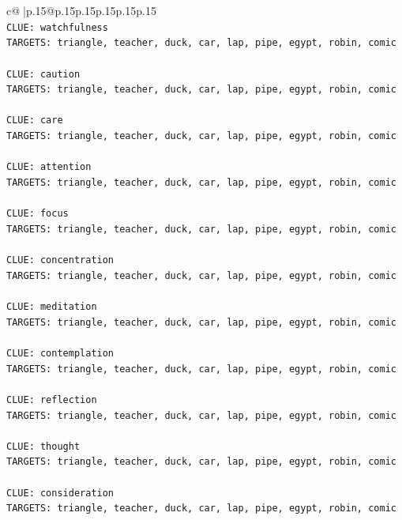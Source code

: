 \documentclass{article}
\begin{document}
{\begin{supertabular}{c@{$\;$}|p{.15\linewidth}@{}p{.15\linewidth}p{.15\linewidth}p{.15\linewidth}p{.15\linewidth}p{.15\linewidth}}
{{{\\ 
\texttt{CLUE: watchfulness} \\
\texttt{TARGETS: triangle, teacher, duck, car, lap, pipe, egypt, robin, comic} \\
\\ 
\texttt{CLUE: caution} \\
\texttt{TARGETS: triangle, teacher, duck, car, lap, pipe, egypt, robin, comic} \\
\\ 
\texttt{CLUE: care} \\
\texttt{TARGETS: triangle, teacher, duck, car, lap, pipe, egypt, robin, comic} \\
\\ 
\texttt{CLUE: attention} \\
\texttt{TARGETS: triangle, teacher, duck, car, lap, pipe, egypt, robin, comic} \\
\\ 
\texttt{CLUE: focus} \\
\texttt{TARGETS: triangle, teacher, duck, car, lap, pipe, egypt, robin, comic} \\
\\ 
\texttt{CLUE: concentration} \\
\texttt{TARGETS: triangle, teacher, duck, car, lap, pipe, egypt, robin, comic} \\
\\ 
\texttt{CLUE: meditation} \\
\texttt{TARGETS: triangle, teacher, duck, car, lap, pipe, egypt, robin, comic} \\
\\ 
\texttt{CLUE: contemplation} \\
\texttt{TARGETS: triangle, teacher, duck, car, lap, pipe, egypt, robin, comic} \\
\\ 
\texttt{CLUE: reflection} \\
\texttt{TARGETS: triangle, teacher, duck, car, lap, pipe, egypt, robin, comic} \\
\\ 
\texttt{CLUE: thought} \\
\texttt{TARGETS: triangle, teacher, duck, car, lap, pipe, egypt, robin, comic} \\
\\ 
\texttt{CLUE: consideration} \\
\texttt{TARGETS: triangle, teacher, duck, car, lap, pipe, egypt, robin, comic} \\
\\ 
}}}
\end{supertabular}}
\end{document}
